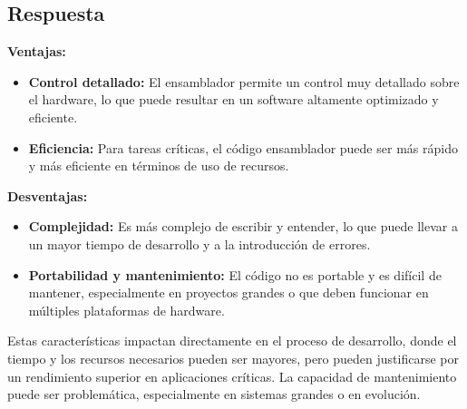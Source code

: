 \documentclass{article}
\begin{document}
\subsection*{Respuesta}
\textbf{Ventajas:}
\begin{itemize}
    \item \textbf{Control detallado:} El ensamblador permite un control muy detallado sobre el hardware, lo que puede resultar en un software altamente optimizado y eficiente.
    \item \textbf{Eficiencia:} Para tareas críticas, el código ensamblador puede ser más rápido y más eficiente en términos de uso de recursos.
\end{itemize}
\textbf{Desventajas:}
\begin{itemize}
    \item \textbf{Complejidad:} Es más complejo de escribir y entender, lo que puede llevar a un mayor tiempo de desarrollo y a la introducción de errores.
    \item \textbf{Portabilidad y mantenimiento:} El código no es portable y es difícil de mantener, especialmente en proyectos grandes o que deben funcionar en múltiples plataformas de hardware.
\end{itemize}
Estas características impactan directamente en el proceso de desarrollo, donde el tiempo y los recursos necesarios pueden ser mayores, pero pueden justificarse por un rendimiento superior en aplicaciones críticas. La capacidad de mantenimiento puede ser problemática, especialmente en sistemas grandes o en evolución.
\end{document}

